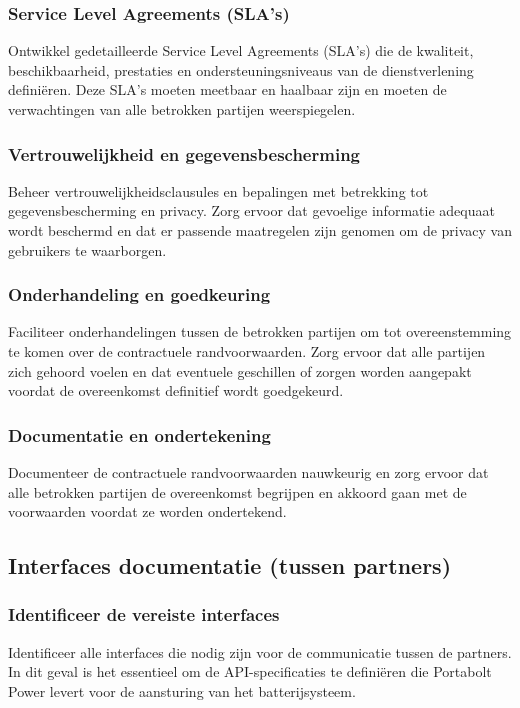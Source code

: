 \documentclass[../main.tex]{subfiles}
\begin{document}
\subsubsection{Service Level Agreements (SLA's)}
Ontwikkel gedetailleerde Service Level Agreements (SLA's) die de kwaliteit, beschikbaarheid, prestaties en ondersteuningsniveaus van de dienstverlening definiëren. Deze SLA's moeten meetbaar en haalbaar zijn en moeten de verwachtingen van alle betrokken partijen weerspiegelen.

\subsubsection{Vertrouwelijkheid en gegevensbescherming}
Beheer vertrouwelijkheidsclausules en bepalingen met betrekking tot gegevensbescherming en privacy. Zorg ervoor dat gevoelige informatie adequaat wordt beschermd en dat er passende maatregelen zijn genomen om de privacy van gebruikers te waarborgen.

\subsubsection{Onderhandeling en goedkeuring}
Faciliteer onderhandelingen tussen de betrokken partijen om tot overeenstemming te komen over de contractuele randvoorwaarden. Zorg ervoor dat alle partijen zich gehoord voelen en dat eventuele geschillen of zorgen worden aangepakt voordat de overeenkomst definitief wordt goedgekeurd.

\subsubsection{Documentatie en ondertekening}
Documenteer de contractuele randvoorwaarden nauwkeurig en zorg ervoor dat alle betrokken partijen de overeenkomst begrijpen en akkoord gaan met de voorwaarden voordat ze worden ondertekend.

\subsection{Interfaces documentatie (tussen partners)}

\subsubsection{Identificeer de vereiste interfaces}
Identificeer alle interfaces die nodig zijn voor de communicatie tussen de partners. In dit geval is het essentieel om de API-specificaties te definiëren die Portabolt Power levert voor de aansturing van het batterijsysteem.
\end{document}
